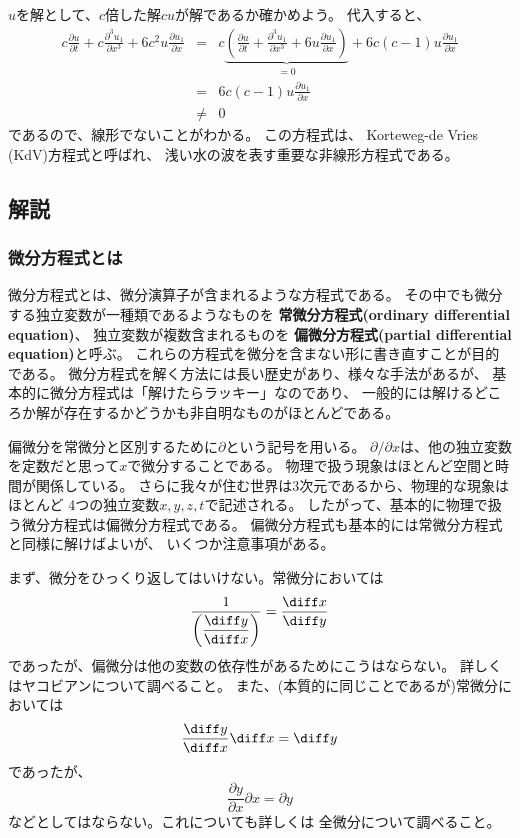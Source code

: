 $u$を解として、$c$倍した解$cu$が解であるか確かめよう。
代入すると、
\begin{eqnarray}
  c \frac{\partial u}{\partial t} +  c\frac{\partial^3 u_1}{\partial x^3} + 6 c^2 u\frac{\partial u_1}{\partial x}  &=&
  c \underbrace{\left( \frac{\partial u}{\partial t} +  \frac{\partial^3 u_1}{\partial x^3} + 6 u \frac{\partial u_1}{\partial x} \right)}_{=0} + 6c(c-1)u \frac{\partial u_1}{\partial x} \\
  &=& 6c(c-1) u\frac{\partial u_1}{\partial x} \\
  &\ne& 0
\end{eqnarray}
であるので、線形でないことがわかる。
この方程式は、 Korteweg-de Vries (KdV)方程式と呼ばれ、
浅い水の波を表す重要な非線形方程式である。

\subsection{解説}

\subsubsection{微分方程式とは}

微分方程式とは、微分演算子が含まれるような方程式である。
その中でも微分する独立変数が一種類であるようなものを
{\bf 常微分方程式(ordinary differential equation)}、
独立変数が複数含まれるものを
{\bf 偏微分方程式(partial differential equation)}と呼ぶ。
これらの方程式を微分を含まない形に書き直すことが目的である。
微分方程式を解く方法には長い歴史があり、様々な手法があるが、
基本的に微分方程式は「解けたらラッキー」なのであり、
一般的には解けるどころか解が存在するかどうかも非自明なものがほとんどである。

偏微分を常微分と区別するために$\partial$という記号を用いる。
$\partial/\partial x$は、他の独立変数を定数だと思って$x$で微分することである。
物理で扱う現象はほとんど空間と時間が関係している。
さらに我々が住む世界は3次元であるから、物理的な現象はほとんど
4つの独立変数$x,y,z,t$で記述される。
したがって、基本的に物理で扱う微分方程式は偏微分方程式である。
偏微分方程式も基本的には常微分方程式と同様に解けばよいが、
いくつか注意事項がある。

まず、微分をひっくり返してはいけない。常微分においては
\begin{equation}
  \frac{1}{\displaystyle \left( \frac{\diff y}{\diff x} \right)} = \frac{\diff x}{\diff y}
\end{equation}
であったが、偏微分は他の変数の依存性があるためにこうはならない。
詳しくはヤコビアンについて調べること。
また、(本質的に同じことであるが)常微分においては
\begin{equation}
  \frac{\diff y}{\diff x} \diff x = \diff y
\end{equation}
であったが、
\begin{equation}
  \frac{\partial y}{\partial x} \partial x = \partial y
\end{equation}
などとしてはならない。これについても詳しくは
全微分について調べること。

